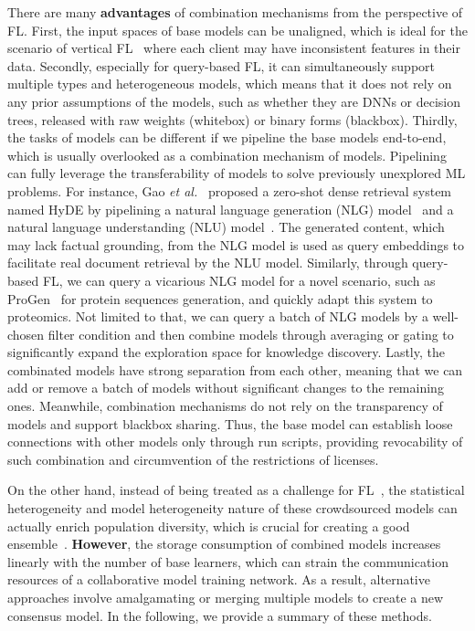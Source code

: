 There are many \textbf{advantages} of combination mechanisms from the perspective of FL.
First, the input spaces of base models can be unaligned, which is ideal for the scenario of vertical FL~\cite{wu2022practical} where each client may have inconsistent features in their data.
Secondly, especially for query-based FL, it can simultaneously support multiple types and heterogeneous models, which means that it does not rely on any prior assumptions of the models, such as whether they are DNNs or decision trees, released with raw weights (whitebox) or binary forms (blackbox).
Thirdly, the tasks of models can be different if we pipeline the base models end-to-end, which is usually overlooked as a combination mechanism of models. 
Pipelining can fully leverage the transferability of models to solve previously unexplored ML problems.
For instance, Gao \textit{et al.}~\cite{gao2022precise} proposed a zero-shot dense retrieval system named HyDE by pipelining a natural language generation (NLG) model~\cite{ouyang2022training} and a natural language understanding (NLU) model~\cite{izacard2021towards}.
The generated content, which may lack factual grounding, from the NLG model is used as query embeddings to facilitate real document retrieval by the NLU model.
Similarly, through query-based FL, we can query a vicarious NLG model for a novel scenario, such as ProGen~\cite{madani2023large} for protein sequences generation, and quickly adapt this system to proteomics.
Not limited to that, we can query a batch of NLG models by a well-chosen filter condition and then combine models through averaging or gating to significantly expand the exploration space for knowledge discovery.
Lastly, the combinated models have strong separation from each other, meaning that we can add or remove a batch of models without significant changes to the remaining ones.
Meanwhile, combination mechanisms do not rely on the transparency of models and support blackbox sharing. 
Thus, the base model can establish loose connections with other models only through run scripts, providing revocability of such combination and circumvention of the restrictions of licenses.

On the other hand, instead of being treated as a challenge for FL~\cite{ma2022state}, the statistical heterogeneity and model heterogeneity nature of these crowdsourced models can actually enrich population diversity, which is crucial for creating a good ensemble~\cite{maclin1995combining, opitz1995generating}. 
\textbf{However}, the storage consumption of combined models increases linearly with the number of base learners, which can strain the communication resources of a collaborative model training network. 
As a result, alternative approaches involve amalgamating or merging multiple models to create a new consensus model. 
In the following, we provide a summary of these methods.

